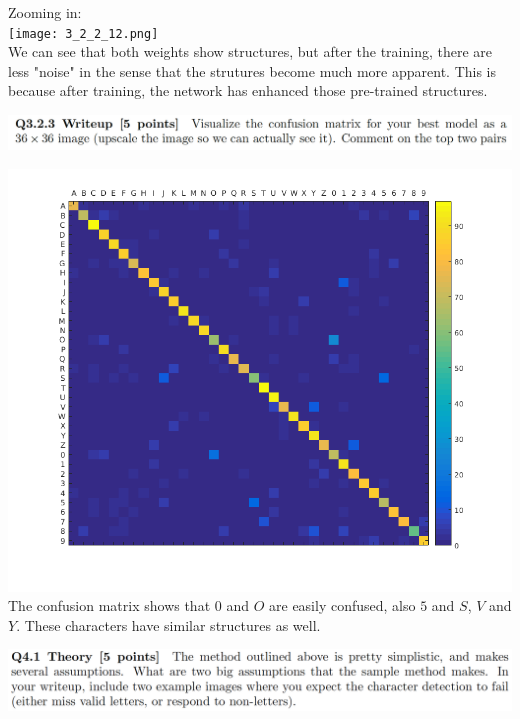 \documentclass[12pt,letterpaper,boxed]{hmcpset}
\begin{document}
\begin{solution}
Zooming in:\\
\texttt{[image: 3\_2\_2\_12.png]}\\
We can see that both weights show structures, but after the training, there are less "noise" in the 
sense that the strutures become much more apparent. This is because after training, the 
network has enhanced those pre-trained structures.
\end{solution}
\newpage

\begin{problem}[]
\includegraphics[width=\textwidth]{3_2_3.png}
\end{problem}

\begin{solution}
\includegraphics[width=\textwidth]{3_2_3_1.png}
The confusion matrix shows that $0$ and $O$ are easily confused, also $5$ and $S$, $V$ and $Y$. These
characters have similar structures as well.
\end{solution}
\newpage

\begin{problem}[]
\includegraphics[width=\textwidth]{4_1.png}
\end{problem}
\end{document}
